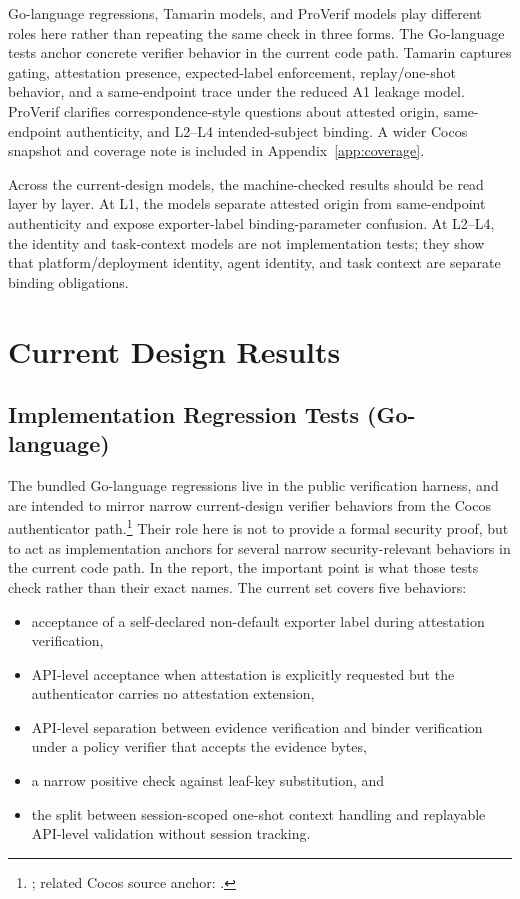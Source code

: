 \documentclass[11pt,a4paper]{article}
\begin{document}
\vspace{0.5em}
Go-language regressions, Tamarin models, and ProVerif models play different
roles here rather than repeating the same check in three forms. The Go-language
tests anchor concrete verifier behavior in the current code path. Tamarin
captures gating, attestation presence, expected-label enforcement,
replay/one-shot behavior, and a same-endpoint trace under the reduced A1
leakage model.
ProVerif clarifies correspondence-style questions about attested origin,
same-endpoint authenticity, and L2--L4 intended-subject binding. A wider
Cocos snapshot and coverage note is included in Appendix~\ref{app:coverage}.

Across the current-design models, the machine-checked results should be read
layer by layer. At L1, the models separate attested origin from same-endpoint
authenticity and expose exporter-label binding-parameter confusion. At
L2--L4, the identity and task-context models are not implementation tests;
they show that platform/deployment identity, agent identity, and task context
are separate binding obligations.

\section{Current Design Results}

\subsection{Implementation Regression Tests (Go-language)}

The bundled Go-language regressions live in the public verification harness,
and are intended to mirror narrow current-design verifier behaviors from the
Cocos authenticator path.\footnote{; related
Cocos source anchor: .} Their role here
is not to provide a formal security proof, but to act as implementation
anchors for several narrow security-relevant behaviors in the current code
path. In the report, the important point is what those tests check rather than
their exact names. The current set covers five behaviors:

\begin{itemize}
\item acceptance of a self-declared non-default exporter label during
attestation verification,
\item API-level acceptance when attestation is explicitly requested but the
authenticator carries no attestation extension,
\item API-level separation between evidence verification and binder
verification under a policy verifier that accepts the evidence bytes,
\item a narrow positive check against leaf-key substitution, and
\item the split between session-scoped one-shot context handling and replayable
API-level validation without session tracking.
\end{itemize}
\end{document}
